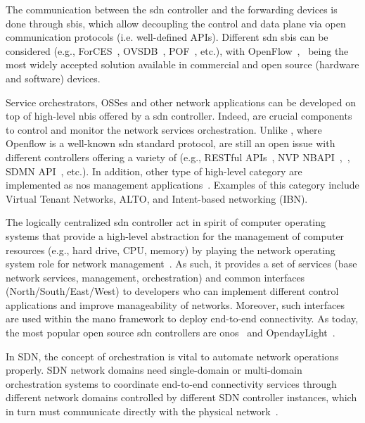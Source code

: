 The communication between the \gls{sdn} controller and the forwarding devices is done through \glspl{sbi}, which allow decoupling the control and data plane via open communication protocols (i.e. well-defined APIs). Different \gls{sdn} \glspl{sbi} can be considered (e.g., ForCES~\cite{Doria2010}, OVSDB~\cite{Davie2013RFCProtocol}, POF~\cite{song2013protocol}, etc.), with  OpenFlow~\cite{openFlow},~\cite{SDXCentral2014WhatAPIs} being the most widely accepted solution available in commercial and open source (hardware and software) devices. 

Service orchestrators, OSSes and other network applications can be developed on top of high-level \glspl{nbi} offered by a \gls{sdn} controller. Indeed,  are crucial components to control and monitor the network services orchestration. Unlike , where Openflow is a well-known \gls{sdn} standard protocol,  are still an open issue with different controllers offering a variety of  (e.g., RESTful APIs~\cite{richardson2008restful}, NVP NBAPI~\cite{onix},~\cite{koponen2014network}, SDMN API~\cite{pentikousis2013mobileflow}, etc.). In addition, other type of high-level  category are implemented as \gls{nos} management applications~\cite{Rotsos2017NetworkSurvey}. Examples of this category include Virtual Tenant Networks, ALTO, and Intent-based networking (IBN).

The logically centralized \gls{sdn} controller act in spirit of computer operating systems that provide a high-level abstraction for the management of computer resources (e.g., hard drive, CPU, memory) by playing the network operating system role for network management~\cite{gude2008nox}. As such, it provides a set of services (base network services, management, orchestration) and common interfaces (North/South/East/West) to developers who can implement different control applications and improve manageability of networks. Moreover, such interfaces are used within the \gls{mano} framework to deploy end-to-end connectivity. As today, the most popular open source \gls{sdn} controllers are \gls{onos}~\cite{ON.LABONOSScale-out.} and OpendayLight~\cite{LinuxFoundationOpenDaylight}.

In SDN, the concept of orchestration is vital to automate network operations properly. SDN network domains need single-domain or multi-domain orchestration systems to coordinate end-to-end connectivity services through different network domains controlled by different SDN controller instances, which in turn must communicate directly with the physical network~\cite{SDNevolution}.

